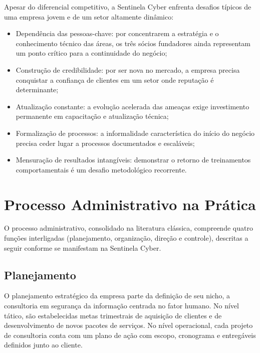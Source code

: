 \documentclass[12pt,a4paper]{article}
\begin{document}
Apesar do diferencial competitivo, a Sentinela Cyber enfrenta desafios típicos
de uma empresa jovem e de um setor altamente dinâmico:

\begin{itemize}[noitemsep]
  \item Dependência das pessoas-chave: por concentrarem a estratégia e o
        conhecimento técnico das áreas, os três sócios fundadores ainda
        representam um ponto crítico para a continuidade do negócio;
  \item Construção de credibilidade: por ser nova no mercado, a empresa precisa
        conquistar a confiança de clientes em um setor onde reputação é
        determinante;
  \item Atualização constante: a evolução acelerada das ameaças exige
        investimento permanente em capacitação e atualização técnica;
  \item Formalização de processos: a informalidade característica do início do
        negócio precisa ceder lugar a processos documentados e escaláveis;
  \item Mensuração de resultados intangíveis: demonstrar o retorno de
        treinamentos comportamentais é um desafio metodológico recorrente.
\end{itemize}

\section{Processo Administrativo na Prática}

O processo administrativo, consolidado na literatura clássica, compreende
quatro funções interligadas (planejamento, organização, direção e controle),
descritas a seguir conforme se manifestam na Sentinela Cyber.

\subsection{Planejamento}

O planejamento estratégico da empresa parte da definição de seu nicho, a
consultoria em segurança da informação centrada no fator humano. No nível
tático, são estabelecidas metas trimestrais de aquisição de clientes e de
desenvolvimento de novos pacotes de serviços. No nível operacional, cada
projeto de consultoria conta com um plano de ação com escopo, cronograma e
entregáveis definidos junto ao cliente.
\end{document}
